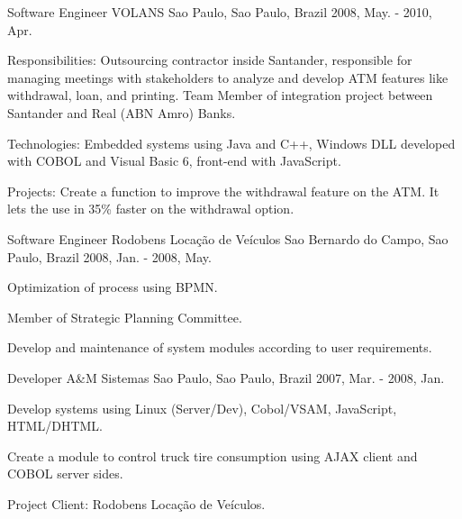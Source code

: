 \begin{cventries}
  \cventry
    {Software Engineer} %
    {VOLANS} %
    {Sao Paulo, Sao Paulo, Brazil} %
    {2008, May. - 2010, Apr.} %
    {
          \begin{cvitems} %
            \item {Responsibilities: Outsourcing contractor inside Santander, responsible for managing meetings with stakeholders to analyze and develop ATM features like withdrawal, loan, and printing. Team Member of integration project between Santander and Real (ABN Amro) Banks.}
            \item {Technologies: Embedded systems using Java and C++, Windows DLL developed with COBOL and Visual Basic 6, front-end with JavaScript.}
            \item {Projects: Create a function to improve the withdrawal feature on the ATM. It lets the use in 35\% faster on the withdrawal option.}
          \end{cvitems}
    }

  \cventry
    {Software Engineer} %
    {Rodobens Locação de Veículos} %
    {Sao Bernardo do Campo, Sao Paulo, Brazil} %
    {2008, Jan. - 2008, May.} %
    {
          \begin{cvitems} %
            \item {Optimization of process using BPMN.}
            \item {Member of Strategic Planning Committee.}
            \item {Develop and maintenance of system modules according to user requirements.}
          \end{cvitems}
    }

  \cventry
    {Developer} %
    {A\&M Sistemas} %
    {Sao Paulo, Sao Paulo, Brazil} %
    {2007, Mar. - 2008, Jan.} %
    {
          \begin{cvitems} %
            \item {Develop systems using Linux (Server/Dev), Cobol/VSAM, JavaScript, HTML/DHTML.}
            \item {Create a module to control truck tire consumption using AJAX client and COBOL server sides.}
            \item {Project Client: Rodobens Locação de Veículos.}
          \end{cvitems}
    }


\end{cventries}
